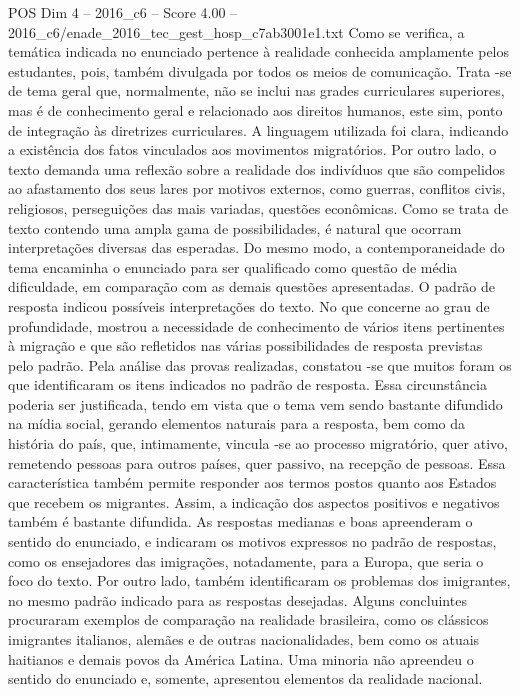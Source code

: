 \begin{textsample}{POS Dim 4 – 2016\_c6 – Score 4.00 – 2016\_c6/enade\_2016\_tec\_gest\_hosp\_c7ab3001e1.txt}
Como se verifica, a temática indicada no enunciado pertence à realidade conhecida amplamente pelos estudantes, pois, também divulgada por todos os meios de comunicação.
Trata -se de tema geral que, normalmente, não se inclui nas grades curriculares superiores, mas é de conhecimento geral e relacionado aos direitos humanos, este sim, ponto de integração às diretrizes curriculares.
A linguagem utilizada foi clara, indicando a existência dos fatos vinculados aos movimentos migratórios.
Por outro lado, o texto demanda uma reflexão sobre a realidade dos indivíduos que são compelidos ao afastamento dos seus lares por motivos externos, como guerras, conflitos civis, religiosos, perseguições das mais variadas, questões econômicas.
Como se trata de texto contendo uma ampla gama de possibilidades, é natural que ocorram interpretações diversas das esperadas.
Do mesmo modo, a contemporaneidade do tema encaminha o enunciado para ser qualificado como questão de média dificuldade, em comparação com as demais questões apresentadas.
O padrão de resposta indicou possíveis interpretações do texto.
No que concerne ao grau de profundidade, mostrou a necessidade de conhecimento de vários itens pertinentes à migração e que são refletidos nas várias possibilidades de resposta previstas pelo padrão.
Pela análise das provas realizadas, constatou -se que muitos foram os que identificaram os itens indicados no padrão de resposta.
Essa circunstância poderia ser justificada, tendo em vista que o tema vem sendo bastante difundido na mídia social, gerando elementos naturais para a resposta, bem como da história do país, que, intimamente, vincula -se ao processo migratório, quer ativo, remetendo pessoas para outros países, quer passivo, na recepção de pessoas.
Essa característica também permite responder aos termos postos quanto aos Estados que recebem os migrantes.
Assim, a indicação dos aspectos positivos e negativos também é bastante difundida.
As respostas medianas e boas apreenderam o sentido do enunciado, e indicaram os motivos expressos no padrão de respostas, como os ensejadores das imigrações, notadamente, para a Europa, que seria o foco do texto.
Por outro lado, também identificaram os problemas dos imigrantes, no mesmo padrão indicado para as respostas desejadas.
Alguns concluintes procuraram exemplos de comparação na realidade brasileira, como os clássicos imigrantes italianos, alemães e de outras nacionalidades, bem como os atuais haitianos e demais povos da América Latina.
Uma minoria não apreendeu o sentido do enunciado e, somente, apresentou elementos da realidade nacional.

\end{textsample}
